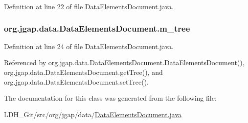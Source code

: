 Definition at line 22 of file Data\-Elements\-Document.\-java.

\hypertarget{classorg_1_1jgap_1_1data_1_1_data_elements_document_a86ba3ecbb890335a70bf91743f4471fb}{
\subsubsection[{m\-\_\-tree}]{ org.\-jgap.\-data.\-Data\-Elements\-Document.\-m\-\_\-tree\hspace{0.3cm}{\ttfamily [private]}}}\label{classorg_1_1jgap_1_1data_1_1_data_elements_document_a86ba3ecbb890335a70bf91743f4471fb}


Definition at line 24 of file Data\-Elements\-Document.\-java.



Referenced by org.\-jgap.\-data.\-Data\-Elements\-Document.\-Data\-Elements\-Document(), org.\-jgap.\-data.\-Data\-Elements\-Document.\-get\-Tree(), and org.\-jgap.\-data.\-Data\-Elements\-Document.\-set\-Tree().



The documentation for this class was generated from the following file\-:\begin{DoxyCompactItemize}
\item 
L\-D\-H\-\_\-\-Git/src/org/jgap/data/\hyperlink{_data_elements_document_8java}{Data\-Elements\-Document.\-java}\end{DoxyCompactItemize}
